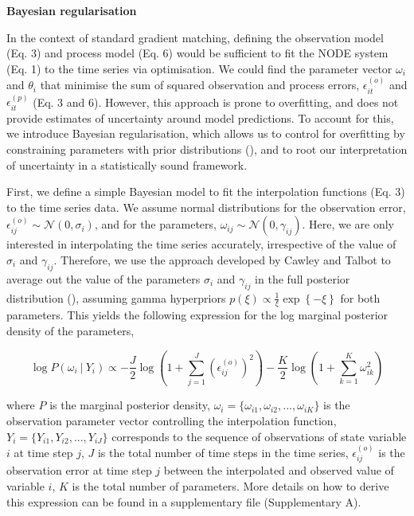 \documentclass[11pt, oneside]{article}
\begin{document}
\textbf{Bayesian regularisation}

In the context of standard gradient matching, defining the observation model (Eq. 3) and process model (Eq. 6) would be sufficient to fit the NODE system (Eq. 1) to the time series via optimisation.
We could find the parameter vector $\omega_i$ and $\theta_i$ that minimise the sum of squared observation and process errors, $\epsilon_{it}^{(o)}$ and $\epsilon_{it}^{(p)}$ (Eq. 3 and 6).
However, this approach is prone to overfitting, and does not provide estimates of uncertainty around model predictions. 
To account for this, we introduce Bayesian regularisation, which allows us to control for overfitting by constraining parameters with prior distributions (\cite{Cawley2007}), and to root our interpretation of uncertainty in a statistically sound framework.

First, we define a simple Bayesian model to fit the interpolation functions (Eq. 3) to the time series data.
We assume normal distributions for the observation error, $\epsilon^{(o)}_{ij} \sim \mathcal{N}(0,\sigma_i)$, and for the parameters, $\omega_{ij} \sim \mathcal{N}(0,\gamma_{ij})$.
Here, we are only interested in interpolating the time series accurately, irrespective of the value of $\sigma_i$ and $\gamma_{ij}$.
Therefore, we use the approach developed by Cawley and Talbot to average out the value of the parameters $\sigma_i$ and $\gamma_{ij}$ in the full posterior distribution (\cite{Cawley2007}), assuming gamma hyperpriors $p(\xi) \propto \frac{1}{\xi} \exp\left\{- \xi \right\}$ for both parameters.
This yields the following expression for the log marginal posterior density of the parameters,

\vspace{-0.5cm}
\begin{equation}
    \log P(\omega_i ~|~ Y_i) \propto - \frac{J}{2} \log \left(1 + \sum_{j=1}^{J} \left( \epsilon^{(o)}_{ij} \right)^2 \right) - \frac{K}{2} \log \left(1 + \sum_{k=1}^{K} \omega_{ik}^2 \right)
\end{equation}

where $P$ is the marginal posterior density,
$\omega_i = \{\omega_{i1},\omega_{i2},...,\omega_{iK}\}$ is the observation parameter vector controlling the interpolation function,
$Y_i = \{Y_{i1},Y_{i2},...,Y_{iJ}\}$ corresponds to the sequence of observations of state variable $i$ at time step $j$, 
$J$ is the total number of time steps in the time series, 
$\epsilon^{(o)}_{ij}$ is the observation error at time step $j$ between the interpolated and observed  value of variable $i$, 
$K$ is the total number of parameters. 
More details on how to derive this expression can be found in a supplementary file (Supplementary A).
\end{document}
